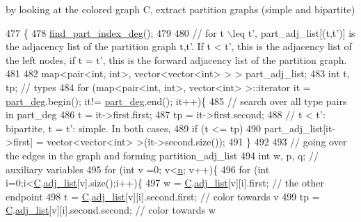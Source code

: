 by looking at the colored graph C, extract partition graphs (simple and bipartite) 


\begin{DoxyCode}
477 \{
478   \hyperlink{classmarked__graph__encoder_a1cb2cd754108302a0437a924dc70bc0e}{find\_part\_index\_deg}();
479 
480   \textcolor{comment}{// for t \(\backslash\)leq t', part\_adj\_list[(t,t')] is the adjacency list of the partition graph t,t'. If t < t',
       this is the adjacency list of the left nodes, if t = t', this is the forward adjacency list of the partition
       graph.}
481 
482   map<pair<int, int>, vector<vector<int> > > part\_adj\_list;
483   \textcolor{keywordtype}{int} t, tp; \textcolor{comment}{// types }
484   \textcolor{keywordflow}{for} (map<pair<int, int>, vector<int> >::iterator it = \hyperlink{classmarked__graph__encoder_a55ea2edb2609dfc287432f61900d6ad1}{part\_deg}.begin(); it!= 
      \hyperlink{classmarked__graph__encoder_a55ea2edb2609dfc287432f61900d6ad1}{part\_deg}.end(); it++)\{
485     \textcolor{comment}{// search over all type pairs in part\_deg}
486     t = it->first.first;
487     tp = it->first.second;
488     \textcolor{comment}{// t < t': bipartite, t = t': simple. In both cases, }
489     \textcolor{keywordflow}{if} (t <= tp)
490       part\_adj\_list[it->first] = vector<vector<int> >(it->second.size());
491   \}
492 
493   \textcolor{comment}{// going over the edges in the graph and forming partition\_adj\_list}
494   \textcolor{keywordtype}{int} w, p, q; \textcolor{comment}{// auxiliary variables }
495   \textcolor{keywordflow}{for} (\textcolor{keywordtype}{int} v =0; v<\hyperlink{classmarked__graph__encoder_a4c66d9fdbc14c97523715aac7e4511cb}{n}; v++)\{
496     \textcolor{keywordflow}{for} (\textcolor{keywordtype}{int} i=0;i<\hyperlink{classmarked__graph__encoder_af82bc0653414091291cb75553a407bdb}{C}.\hyperlink{classcolored__graph_a45dce16965079286cf3f41a54a1b2ea4}{adj\_list}[v].size();i++)\{
497       w = \hyperlink{classmarked__graph__encoder_af82bc0653414091291cb75553a407bdb}{C}.\hyperlink{classcolored__graph_a45dce16965079286cf3f41a54a1b2ea4}{adj\_list}[v][i].first; \textcolor{comment}{// the other endpoint}
498       t = \hyperlink{classmarked__graph__encoder_af82bc0653414091291cb75553a407bdb}{C}.\hyperlink{classcolored__graph_a45dce16965079286cf3f41a54a1b2ea4}{adj\_list}[v][i].second.first; \textcolor{comment}{// color towards v}
499       tp = \hyperlink{classmarked__graph__encoder_af82bc0653414091291cb75553a407bdb}{C}.\hyperlink{classcolored__graph_a45dce16965079286cf3f41a54a1b2ea4}{adj\_list}[v][i].second.second; \textcolor{comment}{// color towards w}

\end{DoxyCode}
